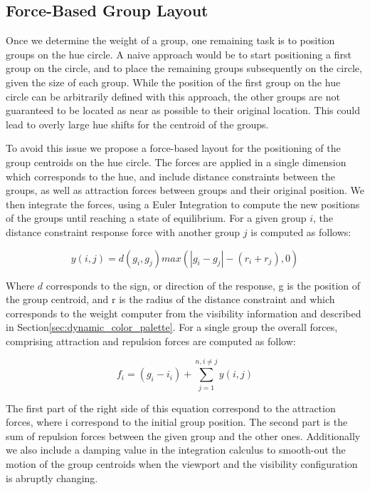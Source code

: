 \documentclass[review,journal]{vgtc}         %
\begin{document}
\subsection{Force-Based Group Layout}

Once we determine the weight of a group, one remaining task is to position groups on the hue circle.
A naive approach would be to start positioning a first group on the circle, and to place the remaining groups subsequently on the circle, given the size of each group.
While the position of the first group on the hue circle can be arbitrarily defined with this approach, the other groups are not guaranteed to be located as near as possible to their original location.
This could lead to overly large hue shifts for the centroid of the groups.

To avoid this issue we propose a force-based layout for the positioning of the group centroids on the hue circle.
The forces are applied in a single dimension which corresponds to the hue, and include distance constraints between the groups, as well as attraction forces between groups and their original position.
We then integrate the forces, using a Euler Integration to compute the new positions of the groups until reaching a state of equilibrium.
For a given group $i$, the distance constraint response force with another group $j$ is computed as follows:

\begin{equation}
y(i, j) = d(g_{i},g_{j})max(|g_{i} - g_{j}| - (r_{i}+r_{j}), 0)
\end{equation}

Where $d$ corresponds to the sign, or direction of the response, g is the position of the group centroid, and r is the radius of the distance constraint and which corresponds to the weight computer from the visibility information and described in Section\ref{sec:dynamic_color_palette}.
For a single group the overall forces, comprising attraction and repulsion forces are computed as follow:

\begin{equation}
f_{i} = (g_{i} - i_{i}) + \sum_{j=1}^{n, i \neq j} y(i,j)
\end{equation}

The first part of the right side of this equation correspond to the attraction forces, where i correspond to the initial group position.
The second part is the sum of repulsion forces between the given group and the other ones.
Additionally we also include a damping value in the integration calculus to smooth-out the motion of the group centroids when the viewport and the visibility configuration is abruptly changing.
\end{document}
